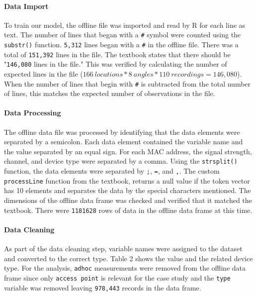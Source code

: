 \documentclass[11pt]{article}
\begin{document}
    \paragraph{Data Import}\label{data-import}

To train our model, the offline file was imported and read by R for each
line as text. The number of lines that began with a \texttt{\#} symbol
were counted using the \texttt{substr()} function. \texttt{5,312} lines
began with a \texttt{\#} in the offline file. There was a total of
\texttt{151,392} lines in the file. The textbook states that there
should be "\texttt{146,080} lines in the file." This was verified by
calculating the number of expected lines in the file
(\(166\ locations * 8\ angles * 110\ recordings = 146,080\)). When the
number of lines that begin with \texttt{\#} is subtracted from the total
number of lines, this matches the expected number of observations in the
file.

\paragraph{Data Processing}\label{data-processing}

The offline data file was processed by identifying that the data
elements were separated by a semicolon. Each data element contained the
variable name and the value separated by an equal sign. For each MAC
address, the signal strength, channel, and device type were separated by
a comma. Using the \texttt{strsplit()} function, the data elements were
separated by \texttt{;}, \texttt{=}, and \texttt{,}. The custom
\texttt{processLine} function from the textbook, returns a null value if
the token vector has 10 elements and separates the data by the special
characters mentioned. The dimensions of the offline data frame was
checked and verified that it matched the textbook. There were
\texttt{1181628} rows of data in the offline data frame at this time.

\paragraph{Data Cleaning}\label{data-cleaning}

As part of the data cleaning step, variable names were assigned to the
dataset and converted to the correct type. Table 2 shows the value and
the related device type. For the analysis, \texttt{adhoc} measurements
were removed from the offline data frame since only
\texttt{access\ point} is relevant for the case study and the
\texttt{type} variable was removed leaving \texttt{978,443} records in
the data frame.
\end{document}
